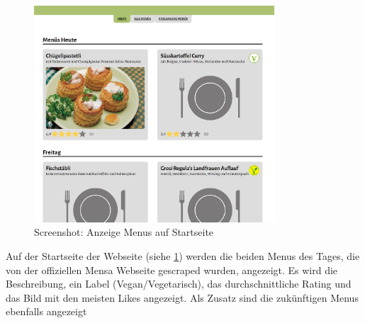 \begin{figure}[ht]
    \centering
    \includegraphics[width=0.8\textwidth]{images/Resultate_Menu.png}
    \caption{Screenshot: Anzeige Menus auf Startseite}
    \label{fig:r-menuindex}
\end{figure}

Auf der Startseite der Webseite (siehe \ref{fig:r-menuindex}) werden die beiden Menus des Tages, die von der
offiziellen Mensa Webseite gescraped wurden, angezeigt. Es wird die
Beschreibung, ein Label (Vegan/Vegetarisch), das durchschnittliche Rating und
das Bild mit den meisten Likes angezeigt. Als Zusatz sind die zukünftigen Menus
ebenfalls angezeigt

